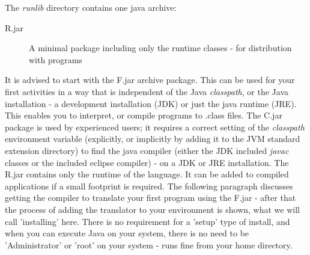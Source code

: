 The \emph{runlib} directory contains one java archive:
\begin{description}
\item[\nr{}R.jar] A minimal package including only the runtime
  \nr{} classes - for distribution with \nr{} programs
\end{description}
It is advised to start with the \nr{}F.jar archive package. This can
be used for your first \nr{} activities in a way that is independent
of the Java \emph{classpath}, or the Java installation - a development
installation (JDK) or just the java runtime (JRE). This enables you to interpret, or
compile \nr{} programs to .class files. The \nr{}C.jar package is
used by experienced \nr{} users; it requires a correct setting of
the \emph{classpath} environment variable (explicitly, or implicitly
by adding it to the JVM standard extension directory) to find the java
compiler (either the JDK included \emph{javac} classes or the included
eclipse compiler) - on a JDK or JRE installation. The \nr{}R.jar
contains only the runtime of the \nr{} language. It can be added to
compiled \nr{} applications if a small footprint is required. The
following paragraph discusses getting the compiler to translate your
first program using the \nr{}F.jar - after that the process of
adding the translator to your environment is shown, what we will call
'installing' here. There is no requirement for a 'setup' type of
install, and when you can execute Java on your system, there is no
need to be 'Administrator' or 'root' on your system - \nr{} runs
fine from your home directory.

